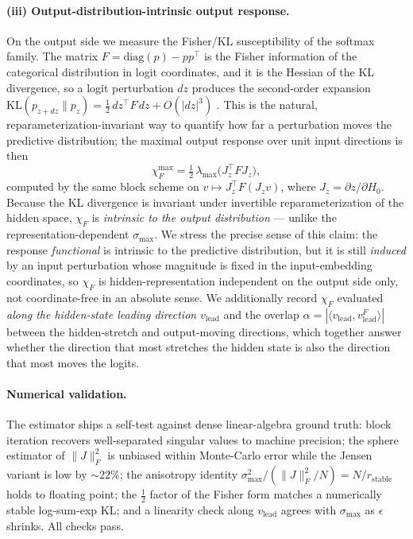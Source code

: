 \documentclass{article}
\begin{document}
\paragraph{(iii) Output-distribution-intrinsic output response.}
On the output side we measure the Fisher/KL susceptibility of the softmax family. The matrix
$F=\mathrm{diag}(p)-pp^\top$ is the Fisher information of the categorical distribution in logit
coordinates, and it is the Hessian of the KL divergence, so a logit perturbation $dz$ produces the
second-order expansion $\mathrm{KL}(p_{z+dz}\|p_z)=\tfrac12\,dz^\top F\,dz+O(|dz|^3)$
\cite{amari1998natural}. This is the natural, reparameterization-invariant way to quantify how far a
perturbation moves the predictive distribution; the maximal output response over unit input
directions is then
\[
  \chi_F^{\max}=\tfrac12\,\lambda_{\max}\!\big(J_z^\top F J_z\big),
\]
computed by the same block scheme on $v\mapsto J_z^\top F (J_z v)$, where
$J_z=\partial z/\partial H_0$. Because the KL divergence is invariant under invertible
reparameterization of the hidden space, $\chi_F$ is \emph{intrinsic to the output distribution}
--- unlike the representation-dependent $\sigma_{\max}$. We stress the precise sense of this
claim: the response \emph{functional} is intrinsic to the predictive distribution, but it is
still \emph{induced} by an input perturbation whose magnitude is fixed in the input-embedding
coordinates, so $\chi_F$ is hidden-representation independent on the output side only, not
coordinate-free in an absolute sense. We additionally record $\chi_F$ evaluated \emph{along the
hidden-state leading direction} $v_{\mathrm{lead}}$ and the overlap
$\alpha=|\langle v_{\mathrm{lead}},v_{\mathrm{lead}}^{F}\rangle|$ between the hidden-stretch and
output-moving directions, which together answer whether the direction that most stretches the
hidden state is also the direction that most moves the logits.

\paragraph{Numerical validation.}
The estimator ships a self-test against dense linear-algebra ground truth: block iteration
recovers well-separated singular values to machine precision; the sphere estimator of
$\|J\|_F^2$ is unbiased within Monte-Carlo error while the Jensen variant is low by $\sim22\%$;
the anisotropy identity $\sigma_{\max}^2/(\|J\|_F^2/N)=N/r_{\mathrm{stable}}$ holds to floating point; the $\tfrac12$ factor of the
Fisher form matches a numerically stable log-sum-exp KL; and a linearity check along
$v_{\mathrm{lead}}$ agrees with $\sigma_{\max}$ as $\epsilon$ shrinks. All checks pass.
\end{document}

